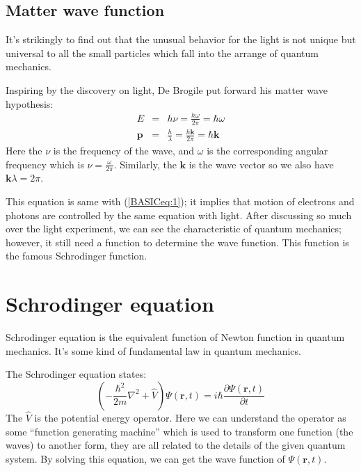 \subsection{Matter wave function}
%
%
%
\label{MWF_in_basic}
%
%
It's strikingly to find out that the unusual behavior for the light
is not unique but universal to all the small particles which fall
into the arrange of quantum mechanics.

Inspiring by the discovery on light, De Brogile put forward his
matter wave hypothesis:
\begin{eqnarray}
\label{BASICeq:16}
  E &=& h\nu = \frac{h\omega}{2\pi} = \hbar\omega \nonumber \\
  \bm{p} &=& \frac{h}{\lambda} = \frac{h\bm{k}}{2\pi} = \hbar \bm{k}
\end{eqnarray}
Here the $\nu$ is the frequency of the wave, and $\omega$ is the
corresponding angular frequency which is $\nu =
\frac{\omega}{2\pi}$. Similarly, the $\bm{k}$ is the wave vector so we
also have $\bm{k}\lambda = 2\pi$.

This equation is same with (\ref{BASICeq:1}); it implies that motion
of electrons and photons are controlled by the same equation with
light.  After discussing so much over the light experiment, we can see
the characteristic of quantum mechanics; however, it still need a
function to determine the wave function. This function is the famous
Schrodinger function.


\section{Schrodinger equation}
\label{SE_in_basic}
%
%
%
Schrodinger equation is the equivalent function of Newton function
in quantum mechanics. It's some kind of fundamental law in quantum
mechanics.

The Schrodinger equation states:
\begin{equation}\label{BASICeq:3}
  \left( -\frac{\hbar^{2}}{2m}\nabla^{2} + \hat{V}\right)\Psi(\bm{r},t)
= i \hbar \frac{\partial \Psi(\bm{r},t)}{\partial t}
\end{equation}
The $\hat{V}$ is the potential energy operator. Here we can
understand the operator as some ``function generating machine'' which
is used to transform one function (the waves) to another form, they
are all related to the details of the given quantum system.  By
solving this equation, we can get the wave function of $\Psi(\bm{r},t)$.


